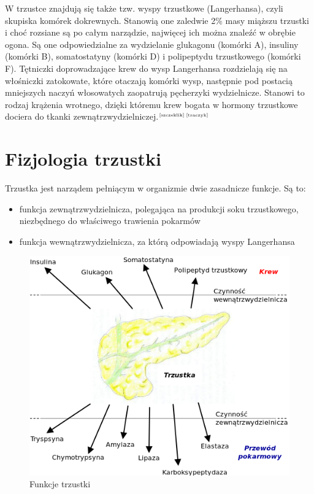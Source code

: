 \documentclass[a4paper, 12pt]{report}
\newcommand\cyt[1]{$^{\tiny{\cite{#1}}}$}
\begin{document}
W trzustce znajdują się także tzw. wyspy trzustkowe (Langerhansa),
czyli skupiska komórek dokrewnych. Stanowią one zaledwie 2\% masy
miąższu trzustki i choć rozsiane są po całym narządzie, najwięcej
ich można znaleźć w obrębie ogona. Są one odpowiedzialne za
wydzielanie glukagonu (komórki A), insuliny (komórki B), somatostatyny
(komórki D) i polipeptydu trzustkowego (komórki F). Tętniczki
doprowadzające krew do wysp Langerhansa rozdzielają się na włośniczki
zatokowate, które otaczają komórki wysp, następnie pod postacią
mniejszych naczyń włosowatych zaopatrują pęcherzyki wydzielnicze. 
Stanowi to rodzaj krążenia wrotnego, dzięki któremu krew bogata w
hormony trzustkowe dociera do tkanki
zewnątrzwydzielniczej.\cyt{szczeklik}\cyt{traczyk}

\chapter{Fizjologia trzustki}

Trzustka jest narządem pełniącym w organizmie dwie zasadnicze
funkcje. Są to:

\begin{itemize}
\setlength{\itemsep}{0cm}
\setlength{\parskip}{0cm}
\item funkcja zewnątrzwydzielnicza, polegająca na produkcji soku
  trzustkowego, niezbędnego do właściwego trawienia pokarmów
\item funkcja wewnątrzwydzielnicza, za którą odpowiadają wyspy
  Langerhansa
\end{itemize}

\begin{figure}[!h]
\centering
\includegraphics[scale=0.35]{pan-fun1}
\caption{Funkcje trzustki}
\end{figure}
\end{document}
